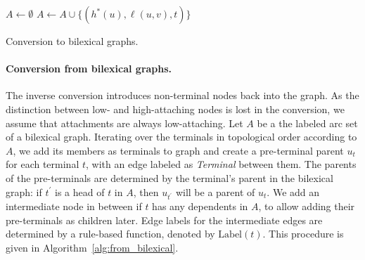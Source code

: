 \documentclass[11pt,a4paper]{article}
\begin{document}
\begin{algorithm}[ht]
 $A \leftarrow \emptyset$\;
  {
   {
   $A \leftarrow A \cup \{(h^*(u), \ell(u, v), t)\}$\;
  }
 }
 \caption{Conversion to bilexical graphs.}
 \label{alg:to_bilexical}
\end{algorithm}

\paragraph{Conversion from bilexical graphs.}
The inverse conversion introduces non-terminal nodes back into the graph.
As the distinction between low- and high-attaching nodes is lost in the
conversion, we assume that attachments are always
low-attaching.
Let $A$ be a the labeled arc set of a bilexical graph.
Iterating over the terminals in topological order according to $A$,
we add its members as terminals to graph
and create a pre-terminal parent $u_t$ for each terminal $t$,
with an edge labeled as \textit{Terminal} between them.
The parents of the pre-terminals are determined by the terminal's parent in the bilexical
graph: if $t^\prime$ is a head of $t$ in $A$, then $u_{t^\prime}$ will be a parent of $u_t$.
We add an intermediate node in between if $t$ has any dependents in $A$,
to allow adding their pre-terminals as children later.
Edge labels for the intermediate edges are determined by a rule-based function, denoted by
$\mathrm{Label}(t)$.
This procedure is given in Algorithm~\ref{alg:from_bilexical}.
\end{document}
